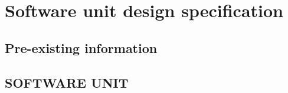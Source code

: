 \section{Software unit design specification}
%
%

\subsection{Pre-existing information}
%

\subsection{SOFTWARE UNIT}
%
%
%
% 
%
%

